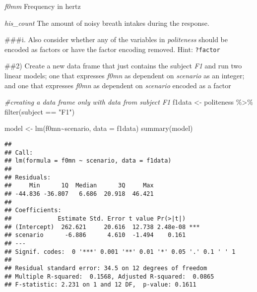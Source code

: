 \documentclass[
]{article}
\newenvironment{Shaded}{\begin{snugshade}}{\end{snugshade}}
\newcommand{\AttributeTok}[1]{\textcolor[rgb]{0.77,0.63,0.00}{#1}}
\newcommand{\CommentTok}[1]{\textcolor[rgb]{0.56,0.35,0.01}{\textit{#1}}}
\newcommand{\FunctionTok}[1]{\textcolor[rgb]{0.00,0.00,0.00}{#1}}
\newcommand{\NormalTok}[1]{#1}
\newcommand{\OtherTok}[1]{\textcolor[rgb]{0.56,0.35,0.01}{#1}}
\newcommand{\SpecialCharTok}[1]{\textcolor[rgb]{0.00,0.00,0.00}{#1}}
\newcommand{\StringTok}[1]{\textcolor[rgb]{0.31,0.60,0.02}{#1}}
\begin{document}
\emph{f0mm} Frequency in hertz

\emph{his\_count} The amount of noisy breath intakes during the
response.

\#\#\#i. Also consider whether any of the variables in \emph{politeness}
should be encoded as factors or have the factor encoding removed. Hint:
\texttt{?factor}

\begin{Shaded}
\end{Shaded}

\#\#2) Create a new data frame that just contains the subject \emph{F1}
and run two linear models; one that expresses \emph{f0mn} as dependent
on \emph{scenario} as an integer; and one that expresses \emph{f0mn} as
dependent on \emph{scenario} encoded as a factor

\begin{Shaded}
\begin{Highlighting}[]
\CommentTok{\#creating a data frame only with data from subject F1}
\NormalTok{f1data }\OtherTok{\textless{}{-}}\NormalTok{ politeness }\SpecialCharTok{\%\textgreater{}\%} 
  \FunctionTok{filter}\NormalTok{(subject }\SpecialCharTok{==} \StringTok{"F1"}\NormalTok{)}

\NormalTok{model }\OtherTok{\textless{}{-}} \FunctionTok{lm}\NormalTok{(f0mn}\SpecialCharTok{\textasciitilde{}}\NormalTok{scenario, }\AttributeTok{data =}\NormalTok{ f1data)}
\FunctionTok{summary}\NormalTok{(model)}
\end{Highlighting}
\end{Shaded}

\begin{verbatim}
## 
## Call:
## lm(formula = f0mn ~ scenario, data = f1data)
## 
## Residuals:
##     Min      1Q  Median      3Q     Max 
## -44.836 -36.807   6.686  20.918  46.421 
## 
## Coefficients:
##             Estimate Std. Error t value Pr(>|t|)    
## (Intercept)  262.621     20.616  12.738 2.48e-08 ***
## scenario      -6.886      4.610  -1.494    0.161    
## ---
## Signif. codes:  0 '***' 0.001 '**' 0.01 '*' 0.05 '.' 0.1 ' ' 1
## 
## Residual standard error: 34.5 on 12 degrees of freedom
## Multiple R-squared:  0.1568, Adjusted R-squared:  0.0865 
## F-statistic: 2.231 on 1 and 12 DF,  p-value: 0.1611
\end{verbatim}
\end{document}
